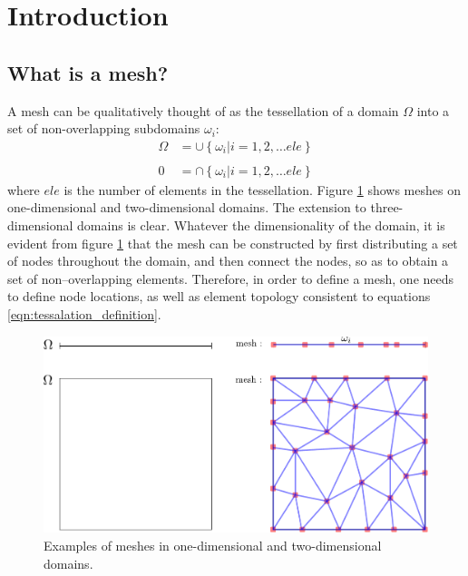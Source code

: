 \section{Introduction}
\label{sect:introduction}

\subsection{What is a mesh?}
\label{ssect:mesh_definition}
\par
A mesh can be qualitatively thought of as the tessellation of a domain $\Omega$ into a set of
non-overlapping subdomains $\omega_i$:
\begin{align}
\Omega &= \cup \left\{ \omega_i \left| i=1,2,\ldots ele \right. \right\} \nonumber \\
\label{eqn:tessalation_definition} \\
0 &= \cap \left\{ \omega_i \left| i=1,2,\ldots ele \right. \right\} \nonumber
\end{align}
where $ele$ is the number of elements in the tessellation. Figure \ref{fig:1d_2d_mesh_examples} shows
meshes on one-dimensional and two-dimensional domains. The extension to three-dimensional domains
is clear. Whatever the dimensionality of the domain, it is evident from figure \ref{fig:1d_2d_mesh_examples} that the mesh can be constructed
by first distributing a set of nodes throughout the domain, and then connect the nodes, so as to obtain
a set of non--overlapping elements. Therefore, in order to define a mesh, one needs to define node locations,
as well as element topology consistent to equations \eqref{eqn:tessalation_definition}.
\begin{figure}[htbp]
 \centering
  \includegraphics[width=1.0\textwidth]{../figures/1d_2d_mesh_examples}
  \caption{Examples of meshes in one-dimensional and two-dimensional domains.}
  \label{fig:1d_2d_mesh_examples}
\end{figure}

